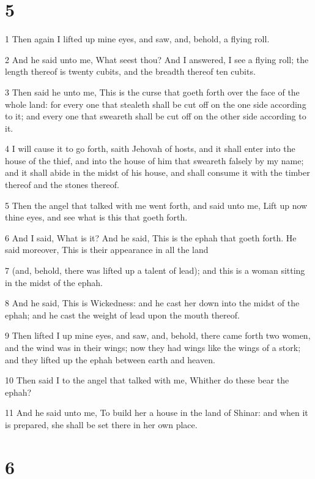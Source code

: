 \chapter{5}

\par 1 Then again I lifted up mine eyes, and saw, and, behold, a flying roll.
\par 2 And he said unto me, What seest thou? And I answered, I see a flying roll; the length thereof is twenty cubits, and the breadth thereof ten cubits.
\par 3 Then said he unto me, This is the curse that goeth forth over the face of the whole land: for every one that stealeth shall be cut off on the one side according to it; and every one that sweareth shall be cut off on the other side according to it.
\par 4 I will cause it to go forth, saith Jehovah of hosts, and it shall enter into the house of the thief, and into the house of him that sweareth falsely by my name; and it shall abide in the midst of his house, and shall consume it with the timber thereof and the stones thereof.
\par 5 Then the angel that talked with me went forth, and said unto me, Lift up now thine eyes, and see what is this that goeth forth.
\par 6 And I said, What is it? And he said, This is the ephah that goeth forth. He said moreover, This is their appearance in all the land
\par 7 (and, behold, there was lifted up a talent of lead); and this is a woman sitting in the midst of the ephah.
\par 8 And he said, This is Wickedness: and he cast her down into the midst of the ephah; and he cast the weight of lead upon the mouth thereof.
\par 9 Then lifted I up mine eyes, and saw, and, behold, there came forth two women, and the wind was in their wings; now they had wings like the wings of a stork; and they lifted up the ephah between earth and heaven.
\par 10 Then said I to the angel that talked with me, Whither do these bear the ephah?
\par 11 And he said unto me, To build her a house in the land of Shinar: and when it is prepared, she shall be set there in her own place.

\chapter{6}

